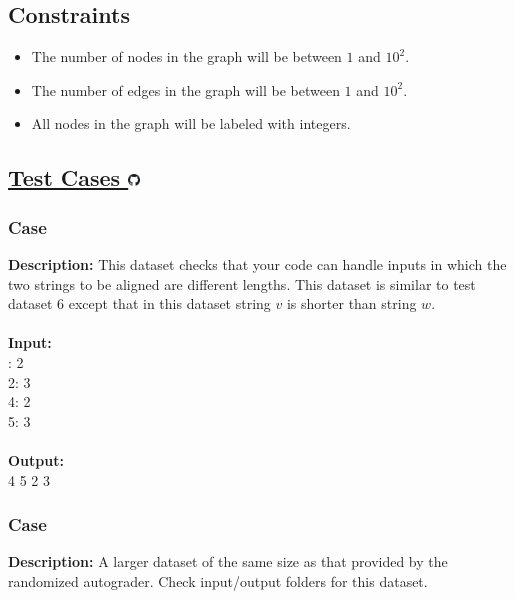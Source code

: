 \documentclass{article}
\newcommand{\code}[1]{{\fontfamily{pcr}\selectfont #1}}
\newcommand{\gitlogo}{\includegraphics[height=12.5]{c0/gitlogo.png}}
\begin{document}
\subsection*{Constraints}
\begin{itemize}
    \item The number of nodes in the graph will be between $1$ and $10^2$.
    \item The number of edges in the graph will be between $1$ and $10^2$.
    \item All nodes in the graph will be labeled with integers.
\end{itemize}
\pagebreak

\subsection*{\href{https://github.com/rjeveloff/BA_problemregister/tree/main/test_cases/chapter_5/5N}{Test Cases \gitlogo}}
\subsubsection*{Case }
\hline \vspace{5}
\textbf{Description:} This dataset checks that your code can handle inputs in which the two strings to be aligned are different lengths. This dataset is similar to test dataset $6$ except that in this dataset string $v$ is shorter than string $w$.\\ \\
\noindent \textbf{Input:}\\
\code{1: 2\\2: 3\\4: 2\\5: 3}\\ \\
\noindent \textbf{Output:}\\
\code{1 4 5 2 3}

\subsubsection*{Case }
\hline \vspace{5}
\textbf{Description:} A larger dataset of the same size as that provided by the randomized autograder. Check input/output folders for this dataset.\\ \\
\pagebreak

\end{document}
